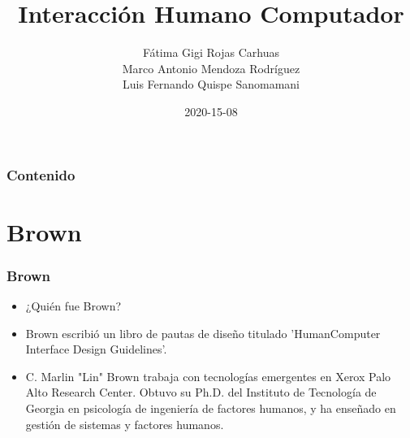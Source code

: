 \documentclass[11pt]{beamer}
\title[Presentación]{\bf\Huge Interacción Humano Computador}
\author[mmendozarod]
{
Fátima Gigi Rojas Carhuas\\
Marco Antonio Mendoza Rodríguez\\
Luis Fernando Quispe Sanomamani
}
\institute[UNSA]
{
\inst{1}%
Escuela profesional de ingeniería de Sistemas\\
Universidad Nacional de San Agustín
}
\date[2020-15-08]{\scriptsize{2020-15-08}}
\begin{document}
\begin{frame}
\titlepage
\end{frame}

\begin{frame}
\frametitle{Contenido}
\tableofcontents
\end{frame}

\section{Brown}
\begin{frame}
\frametitle{Brown}
\begin{itemize}
\item ¿Quién fue Brown?
\item Brown  escribió un libro de pautas de diseño titulado 'HumanComputer Interface Design Guidelines'.

\item C. Marlin "Lin" Brown trabaja con tecnologías emergentes en Xerox Palo Alto Research Center. Obtuvo su Ph.D. del Instituto de Tecnología de Georgia en psicología de ingeniería de factores humanos, y ha enseñado en gestión de sistemas y factores humanos.
\end{itemize}
\end{frame}
\end{document}
